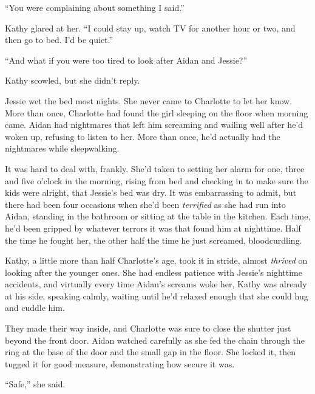 ``You were complaining about something I said.''



Kathy glared at her.  ``I could stay up, watch TV for another hour or two, and then go to bed.  I'd be quiet.''



``And what if you were too tired to look after Aidan and Jessie?''



Kathy scowled, but she didn't reply.



Jessie wet the bed most nights.  She never came to Charlotte to let her know.  More than once, Charlotte had found the girl sleeping on the floor when morning came.  Aidan had nightmares that left him screaming and wailing well after he'd woken up, refusing to listen to her.  More than once, he'd actually had the nightmares while sleepwalking.



It was hard to deal with, frankly.  She'd taken to setting her alarm for one, three and five o'clock in the morning, rising from bed and checking in to make sure the kids were alright, that Jessie's bed was dry.  It was embarrassing to admit, but there had been four occasions when she'd been \emph{terrified} as she had run into Aidan, standing in the bathroom or sitting at the table in the kitchen.  Each time, he'd been gripped by whatever terrors it was that found him at nighttime.  Half the time he fought her, the other half the time he just screamed, bloodcurdling.



Kathy, a little more than half Charlotte's age, took it in stride, almost \emph{thrived} on looking after the younger ones.  She had endless patience with Jessie's nighttime accidents, and virtually every time Aidan's screams woke her, Kathy was already at his side, speaking calmly, waiting until he'd relaxed enough that she could hug and cuddle him.



They made their way inside, and Charlotte was sure to close the shutter just beyond the front door.  Aidan watched carefully as she fed the chain through the ring at the base of the door and the small gap in the floor.  She locked it, then tugged it for good measure, demonstrating how secure it was.



``Safe,'' she said.



